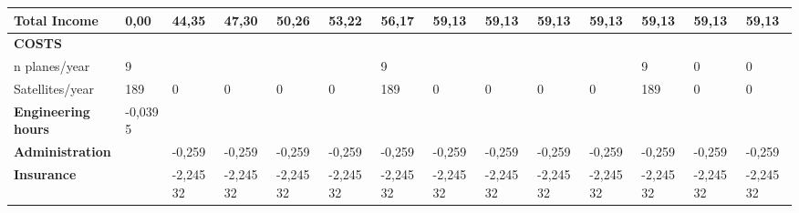 \begin{landscape}
\begin{table}[]
{\begin{tabular}{| l | l | l | l | l | l | l | l | l | l | l | l | l | l |}
\textbf{Total Income}                                                                  & \textbf{0,00}    & \textbf{44,35}  & \textbf{47,30}  & \textbf{50,26}  & \textbf{53,22}  & \textbf{56,17}  & \textbf{59,13}  & \textbf{59,13}  & \textbf{59,13}  & \textbf{59,13}  & \textbf{59,13}   & \textbf{59,13}   & \textbf{59,13}   
\\ \hline
\rowcolor[gray]{0.85}
\textbf{COSTS}                                                                         &                  &                 &                 &                 &                 &                 &                 &                 &                 &                 &                  &                  &                  \\
n planes/year                                                                          & 9                &                 &                 &                 &                 & 9               &                 &                 &                 &                 & 9                & 0                & 0                \\
Satellites/year                                                                        & 189              & 0               & 0               & 0               & 0               & 189             & 0               & 0               & 0               & 0               & 189              & 0                & 0                \\
\textbf{Engineering hours}                                                             & -0,0395          &                 &                 &                 &                 &                 &                 &                 &                 &                 &                  &                  &                  \\
\textbf{Administration}                                                                &                  & -0,259          & -0,259          & -0,259          & -0,259          & -0,259          & -0,259          & -0,259          & -0,259          & -0,259          & -0,259           & -0,259           & -0,259           \\
\textbf{Insurance}                                                                     &                  & -2,24532        & -2,24532        & -2,24532        & -2,24532        & -2,24532        & -2,24532        & -2,24532        & -2,24532        & -2,24532        & -2,24532         & -2,24532         & -2,24532         \\

\end{tabular}}
\end{table}
\end{landscape}
